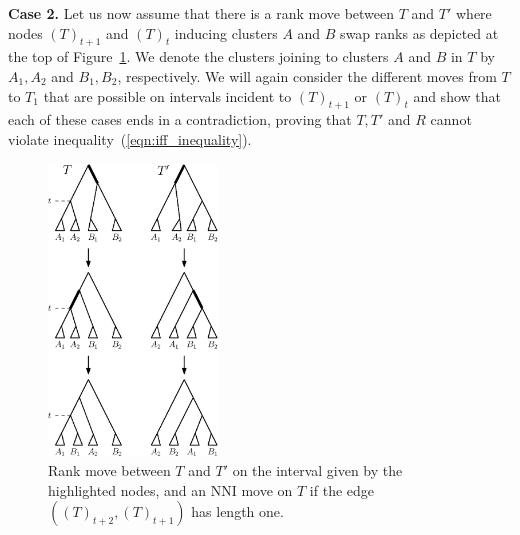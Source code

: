 \documentclass{amsart}
\newcommand{\nni}{\mathrm{NNI}}
\begin{document}
\textbf{Case 2.} Let us now assume that there is a rank move between $T$ and $T'$ where nodes $(T)_{t+1}$ and $(T)_t$ inducing clusters $A$ and $B$ swap ranks as depicted at the top of Figure~\ref{fig:thm_fp_rank1}.
We denote the clusters joining to clusters $A$ and $B$ in $T$ by $A_1,A_2$ and $B_1,B_2$, respectively.
We will again consider the different moves from $T$ to $T_1$ that are possible on intervals incident to $(T)_{t+1}$ or $(T)_{t}$ and show that each of these cases ends in a contradiction, proving that $T,T'$ and $R$ cannot violate inequality~(\ref{eqn:iff_inequality}).

\begin{figure}[!hbt]
\centering
\includegraphics[width=0.4\textwidth]{thm_fp_rank1}
\vspace{12pt}
\caption{Rank move between $T$ and $T'$ on the interval given by the highlighted nodes, and an $\nni$ move on $T$ if the edge $((T)_{t+2},(T)_{t+1})$ has length one.}
\label{fig:thm_fp_rank1}
\end{figure}
\end{document}
